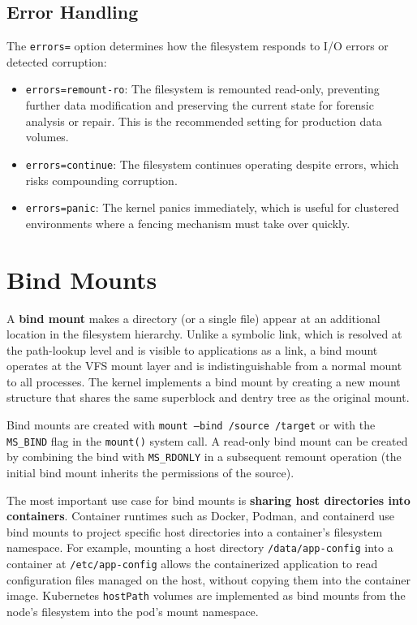 \subsection{Error Handling}

The \texttt{errors=} option determines how the filesystem responds to I/O errors or detected corruption:

\begin{itemize}
  \item \texttt{errors=remount-ro}: The filesystem is remounted read-only, preventing further data modification and preserving the current state for forensic analysis or repair. This is the recommended setting for production data volumes.
  \item \texttt{errors=continue}: The filesystem continues operating despite errors, which risks compounding corruption.
  \item \texttt{errors=panic}: The kernel panics immediately, which is useful for clustered environments where a fencing mechanism must take over quickly.
\end{itemize}

\section{Bind Mounts}

A \textbf{bind mount} makes a directory (or a single file) appear at an additional location in the filesystem hierarchy. Unlike a symbolic link, which is resolved at the path-lookup level and is visible to applications as a link, a bind mount operates at the VFS mount layer and is indistinguishable from a normal mount to all processes. The kernel implements a bind mount by creating a new mount structure that shares the same superblock and dentry tree as the original mount.

Bind mounts are created with \texttt{mount --bind /source /target} or with the \texttt{MS\_BIND} flag in the \texttt{mount()} system call. A read-only bind mount can be created by combining the bind with \texttt{MS\_RDONLY} in a subsequent remount operation (the initial bind mount inherits the permissions of the source).

The most important use case for bind mounts is \textbf{sharing host directories into containers}. Container runtimes such as Docker, Podman, and containerd use bind mounts to project specific host directories into a container's filesystem namespace. For example, mounting a host directory \texttt{/data/app-config} into a container at \texttt{/etc/app-config} allows the containerized application to read configuration files managed on the host, without copying them into the container image. Kubernetes \texttt{hostPath} volumes are implemented as bind mounts from the node's filesystem into the pod's mount namespace.


